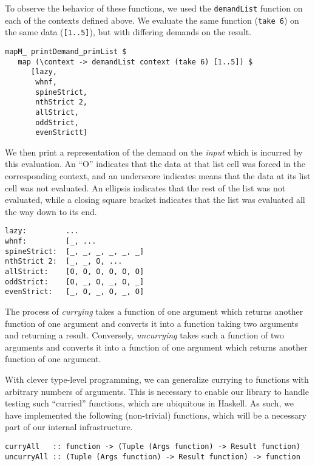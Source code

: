 \documentclass{article}
\begin{document}
To observe the behavior of these functions, we used the \verb|demandList|
function on each of the contexts defined above. We evaluate the same function
(\verb|take 6|) on the same data (\verb|[1..5]|), but with differing demands on
the result.

\begin{verbatim}
mapM_ printDemand_primList $
   map (\context -> demandList context (take 6) [1..5]) $
      [lazy,
       whnf,
       spineStrict,
       nthStrict 2,
       allStrict,
       oddStrict,
       evenStrictt]
\end{verbatim}

We then print a representation of the demand on the \emph{input} which is
incurred by this evaluation. An ``O'' indicates that the data at
that list cell was forced in the corresponding context, and an underscore
indicates means that the data at its list cell was not evaluated. An ellipsis
indicates that the rest of the list was not evaluated, while a closing square
bracket indicates that the list was evaluated all the way down to its end.

\begin{verbatim}
lazy:         ...
whnf:         [_, ...
spineStrict:  [_, _, _, _, _, _]
nthStrict 2:  [_, _, O, ...
allStrict:    [O, O, O, O, O, O]
oddStrict:    [O, _, O, _, O, _]
evenStrict:   [_, O, _, O, _, O]
\end{verbatim}

The process of \emph{currying} takes a function of one argument which returns another function of one argument and converts it into a function taking two arguments and returning a result. Conversely, \emph{uncurrying} takes such a function of two arguments and converts it into a function of one argument which returns another function of one argument.

With clever type-level programming, we can generalize currying to functions with arbitrary numbers of arguments. This is necessary to enable our library to handle testing such ``curried'' functions, which are ubiquitous in Haskell. As such, we have implemented the following (non-trivial) functions, which will be a necessary part of our internal infrastructure.

\begin{verbatim}
curryAll   :: function -> (Tuple (Args function) -> Result function)
uncurryAll :: (Tuple (Args function) -> Result function) -> function
\end{verbatim}
\end{document}
